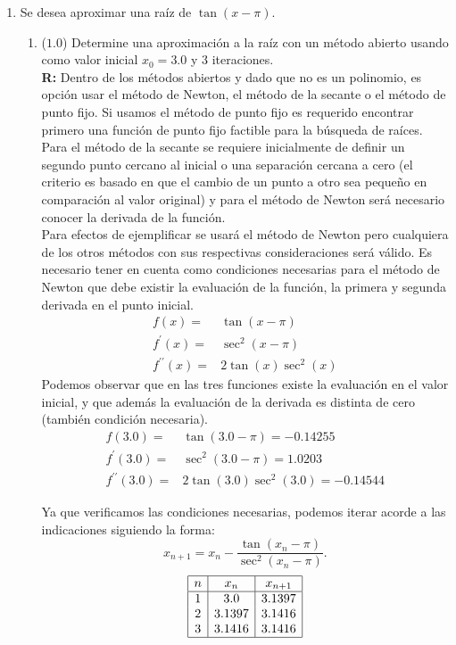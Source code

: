 \documentclass[12pt]{article}
\begin{document}
\begin{enumerate}[leftmargin=*,widest=9]
\begin{enumerate}[label=\alph*]
\end{enumerate}

   \item Se desea aproximar una raíz de \(\tan (x - \pi)\).
   \begin{enumerate}[label=\alph*]
   \item (\(1.0\)) Determine una aproximación a la raíz con un método abierto usando como valor inicial \(x_0=3.0\) y 3 iteraciones.\\
	 \textbf{R:} Dentro de los métodos abiertos y dado que no es un polinomio, es opción usar el método de Newton, el método de la secante o el método de punto fijo. Si usamos el método de punto fijo es requerido encontrar primero una función de punto fijo factible para la búsqueda de raíces. Para el método de la secante se requiere inicialmente de definir un segundo punto cercano al inicial o una separación cercana a cero (el criterio es basado en que el cambio de un punto a otro sea pequeño en comparación al valor original) y para el método de Newton será necesario conocer la derivada de la función.\\
	 Para efectos de ejemplificar se usará el método de Newton pero cualquiera de los otros métodos con sus respectivas consideraciones será válido. Es necesario tener en cuenta como condiciones necesarias para el método de Newton que debe existir la evaluación de la función, la primera y segunda derivada en el punto inicial.\\
	 \begin{eqnarray*}
	 f(x) = & \tan(x-\pi)\\
	 f^{\prime}(x) = & \sec^2(x - \pi)\\
	 f^{\prime\prime}(x) = &2\tan(x)\sec^2(x)
	 \end{eqnarray*}
	 Podemos observar que en las tres funciones existe la evaluación en el valor inicial, y que además la evaluación de la derivada es distinta de cero (también condición necesaria).
	 \begin{eqnarray*}
	 f(3.0) = & \tan(3.0-\pi) =-0.14255 \\
	 f^{\prime}(3.0) = & \sec^2(3.0 - \pi)=1.0203\\
	 f^{\prime\prime}(3.0) = &2\tan(3.0)\sec^2(3.0)=-0.14544
	 \end{eqnarray*}

	 Ya que verificamos las condiciones necesarias, podemos iterar acorde a las indicaciones siguiendo la forma: \[x_{n+1} = x_n - \frac{\tan(x_n - \pi)}{\sec^2(x_n - \pi)}.\]
\[
	 \begin{array}{|c|c|c|}
	 \hline
	 n & x_n & x_{n+1}\\
	 \hline
	 1 & 3.0 & 3.1397\\
	 2 & 3.1397 & 3.1416\\
	 3 & 3.1416 & 3.1416\\
	 \hline
	 \end{array}
	 \]


\end{enumerate}
\end{enumerate}
\end{document}
